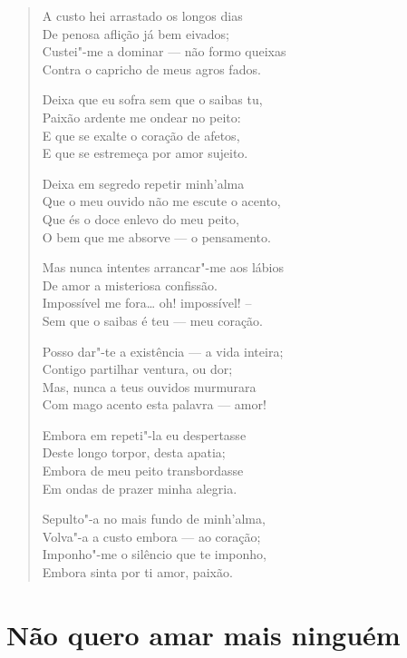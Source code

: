 \begin{verse}
A custo hei arrastado os longos dias\\
De penosa aflição já bem eivados;\\
Custei"-me a dominar --- não formo queixas\\
Contra o capricho de meus agros fados.

Deixa que eu sofra sem que o saibas tu,\\
Paixão ardente me ondear no peito:\\
E que se exalte o coração de afetos,\\
E que se estremeça por amor sujeito.

Deixa em segredo repetir minh'alma\\
Que o meu ouvido não me escute o acento,\\
Que és o doce enlevo do meu peito,\\
O bem que me absorve --- o pensamento.

\pagebreak

Mas nunca intentes arrancar"-me aos lábios\\
De amor a misteriosa confissão.\\
Impossível me fora\ldots{} oh! impossível! --\\
Sem que o saibas é teu --- meu coração.

Posso dar"-te a existência --- a vida inteira;\\
Contigo partilhar ventura, ou dor;\\
Mas, nunca a teus ouvidos murmurara\\
Com mago acento esta palavra --- amor!

Embora em repeti"-la eu despertasse\\
Deste longo torpor, desta apatia;\\
Embora de meu peito transbordasse\\
Em ondas de prazer minha alegria.

Sepulto"-a no mais fundo de minh'alma,\\
Volva"-a a custo embora --- ao coração;\\
Imponho"-me o silêncio que te imponho,\\
Embora sinta por ti amor, paixão.
\end{verse}

\chapter{Não quero amar mais ninguém}


